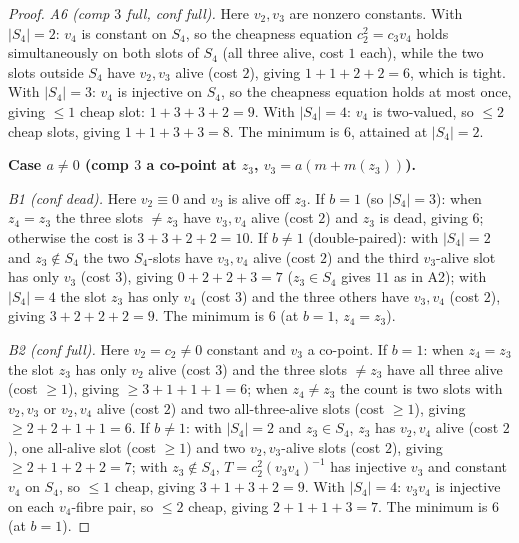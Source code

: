 \documentclass[11pt]{article}
\theoremstyle{plain}
\theoremstyle{definition}
\theoremstyle{remark}
\begin{document}
\begin{proof}
\smallskip
\noindent\emph{A6 (comp $3$ full, conf full).}
Here $v_2,v_3$ are nonzero constants. With $|S_4|=2$: $v_4$ is constant on $S_4$, so the
cheapness equation $c_2^2=c_3v_4$ holds simultaneously on both slots of $S_4$ (all three
alive, cost $1$ each), while the two slots outside $S_4$ have $v_2,v_3$ alive (cost $2$),
giving $1+1+2+2=6$, which is tight. With $|S_4|=3$: $v_4$ is injective on $S_4$, so the
cheapness equation holds at most once, giving $\le 1$ cheap slot: $1+3+3+2=9$. With
$|S_4|=4$: $v_4$ is two-valued, so $\le 2$ cheap slots, giving $1+1+3+3=8$. The minimum is
$6$, attained at $|S_4|=2$.

\medskip
\noindent\textbf{Case $a\ne 0$ (comp $3$ a co-point at $z_3$, $v_3=a(m+m(z_3))$).}

\smallskip
\noindent\emph{B1 (conf dead).}
Here $v_2\equiv 0$ and $v_3$ is alive off $z_3$. If $b=1$ (so $|S_4|=3$): when $z_4=z_3$
the three slots $\ne z_3$ have $v_3,v_4$ alive (cost $2$) and $z_3$ is dead, giving $6$;
otherwise the cost is $3+3+2+2=10$. If $b\ne 1$ (double-paired): with $|S_4|=2$ and
$z_3\notin S_4$ the two $S_4$-slots have $v_3,v_4$ alive (cost $2$) and the third
$v_3$-alive slot has only $v_3$ (cost $3$), giving $0+2+2+3=7$ ($z_3\in S_4$ gives $11$ as
in A2); with $|S_4|=4$ the slot $z_3$ has only $v_4$ (cost $3$) and the three others have
$v_3,v_4$ (cost $2$), giving $3+2+2+2=9$. The minimum is $6$ (at $b=1$, $z_4=z_3$).

\smallskip
\noindent\emph{B2 (conf full).}
Here $v_2=c_2\ne 0$ constant and $v_3$ a co-point. If $b=1$: when $z_4=z_3$ the slot $z_3$
has only $v_2$ alive (cost $3$) and the three slots $\ne z_3$ have all three alive
(cost $\ge 1$), giving $\ge 3+1+1+1=6$; when $z_4\ne z_3$ the count is two slots with
$v_2,v_3$ or $v_2,v_4$ alive (cost $2$) and two all-three-alive slots (cost $\ge 1$),
giving $\ge 2+2+1+1=6$. If $b\ne 1$: with $|S_4|=2$ and $z_3\in S_4$, $z_3$ has $v_2,v_4$
alive (cost $2$), one all-alive slot (cost $\ge1$) and two $v_2,v_3$-alive slots (cost $2$),
giving $\ge 2+1+2+2=7$; with $z_3\notin S_4$, $T=c_2^2(v_3v_4)^{-1}$ has injective $v_3$ and
constant $v_4$ on $S_4$, so $\le 1$ cheap, giving $3+1+3+2=9$. With $|S_4|=4$: $v_3v_4$ is
injective on each $v_4$-fibre pair, so $\le 2$ cheap, giving $2+1+1+3=7$. The minimum
is $6$ (at $b=1$).


\end{proof}
\end{document}

